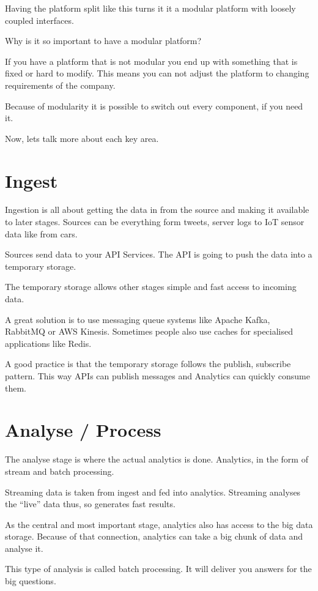 \documentclass[12pt, numbers=noenddot]{scrreprt} %
\begin{document}
Having the platform split like this turns it it a modular platform with loosely coupled interfaces.

Why is it so important to have a modular platform?

If you have a platform that is not modular you end up with something that is fixed or hard to modify. This means you can not adjust the platform to changing requirements of the company.

Because of modularity it is possible to switch out every component, if you need it.

Now, lets talk more about each key area.

\section{Ingest}
Ingestion is all about getting the data in from the source and making it available to later stages. Sources can be everything form tweets, server logs to IoT sensor data like from cars.

Sources send data to your API Services. The API is going to push the data into a temporary storage.

The temporary storage allows other stages simple and fast access to incoming data.

A great solution is to use messaging queue systems like Apache Kafka, RabbitMQ or AWS Kinesis. Sometimes people also use caches for specialised applications like Redis.

A good practice is that the temporary storage follows the publish, subscribe pattern. This way APIs can publish messages and Analytics can quickly consume them.

\section{Analyse / Process}
The analyse stage is where the actual analytics is done. Analytics, in the form of stream and batch processing.

Streaming data is taken from ingest and fed into analytics. Streaming analyses the “live” data thus, so generates fast results.

As the central and most important stage, analytics also has access to the big data storage. Because of that connection, analytics can take a big chunk of data and analyse it.

This type of analysis is called batch processing. It will deliver you answers for the big questions.
\end{document}
